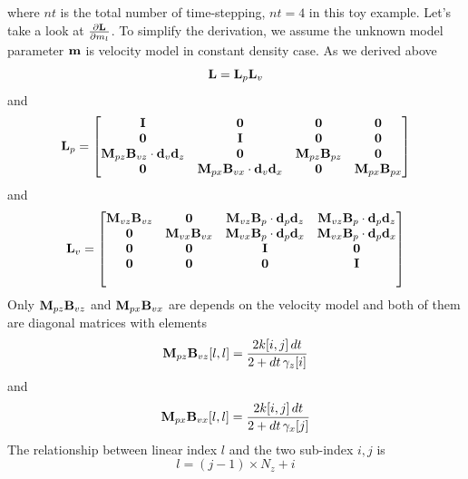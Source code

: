 \documentclass[revised,endfloat]{geophysics}
\begin{document}
where $nt$ is the total number of time-stepping, $nt=4$ in this toy example.
Let's take a look at $\frac{\partial {\bf L}}{\partial m_l}$. To simplify the derivation, we assume the unknown model parameter ${\bf m}$ is velocity model in constant density case. As we derived above 
\begin{equation}
{\bf L} = {\bf L}_p {\bf L}_v 
\label{eq59}
\end{equation}
and
\begin{equation}
{\bf L}_p =
\begin{bmatrix}
\bf{I}   & \bf{0}   & \bf{0} & \bf{0}   \\
\bf{0}   & \bf{I}   & \bf{0} & \bf{0}   \\
{\bf M}_{pz}{\bf B}_{vz} \cdot {\bf d}_v{\bf d}_z & \bf{0} & {\bf M}_{pz}{\bf B}_{pz} & \bf{0}   \\ 
\bf{0} & {\bf M}_{px}{\bf B}_{vx} \cdot {\bf d}_v{\bf d}_x & \bf{0} & {\bf M}_{px}{\bf B}_{px} \\ 
\end{bmatrix}
\label{eq60}
\end{equation}
and 
\begin{equation}
{\bf L}_v =\begin{bmatrix}
{\bf M}_{vz}{\bf B}_{vz} & \bf{0} & {\bf M}_{vz}{\bf B}_{p} \cdot {\bf d}_p{\bf d}_z & {\bf M}_{vz}{\bf B}_{p} \cdot {\bf d}_p{\bf d}_z  \\
\bf{0} & {\bf M}_{vx}{\bf B}_{vx} & {\bf M}_{vx}{\bf B}_{p} \cdot {\bf d}_p{\bf d}_x & {\bf M}_{vx}{\bf B}_{p} \cdot {\bf d}_p{\bf d}_x \\
\bf{0}   & \bf{0}   & \bf{I}   & \bf{0}   \\
\bf{0}   & \bf{0}   & \bf{0}  & \bf{I}    \\\\
\end{bmatrix} 
\label{eq61}
\end{equation}
Only ${\bf M}_{pz}{\bf B}_{vz}$ and ${\bf M}_{px}{\bf B}_{vx}$ are depends on the velocity model and both of them are diagonal matrices with elements 
\begin{equation}
{\bf M}_{pz}{\bf B}_{vz}[l,l] = \frac{2k[i,j] \, dt}{2+dt \, \gamma_z[i]} 
\label{eq62}
\end{equation}
and
\begin{equation}
{\bf M}_{px}{\bf B}_{vx}[l,l] = \frac{2k[i,j] \, dt}{2+dt \, \gamma_x[j]} 
\label{eq63}
\end{equation}
The relationship between linear index $l$ and the two sub-index $i,j$ is 
\begin{equation}
l = (j-1)\times N_z + i
\label{eq64}
\end{equation}
\end{document}
